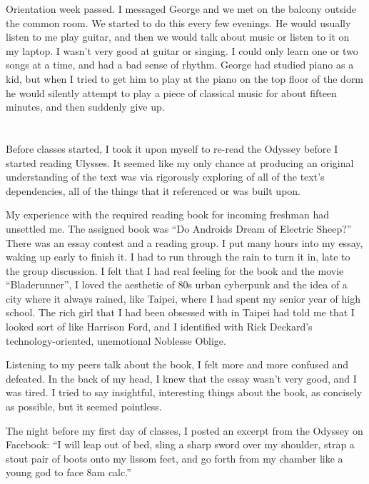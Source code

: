 Orientation week passed.  I messaged George and we met on the balcony outside
the common room.  We started to do this every few evenings.  He would usually
listen to me play guitar, and then we would talk about music or listen to it on
my laptop.  I wasn't very good at guitar or singing.  I could only learn one or
two songs at a time, and had a bad sense of rhythm.  George had studied piano as
a kid, but when I tried to get him to play at the piano on the top floor of the
dorm he would silently attempt to play a piece of classical music for about
fifteen minutes, and then suddenly give up.  

\section{}

Before classes started, I took it upon myself to re-read the Odyssey before I
started reading Ulysses.  It seemed like my only chance at producing an original
understanding of the text was via rigorously exploring of all of the text's
dependencies, all of the things that it referenced or was built upon. 

My experience with the required reading book for incoming freshman had unsettled
me.  The assigned book was ``Do Androids Dream of Electric Sheep?''  There was
an essay contest and a reading group.  I put many hours into my essay, waking up
early to finish it.  I  had to run through the rain to turn it in, late to the
group discussion.  I felt that I had real feeling for the book and the movie
``Bladerunner'', I loved the aesthetic of 80s urban cyberpunk and the idea of a
city where it always rained, like Taipei, where I had spent my senior year of
high school.  The rich girl that I had been obsessed with in Taipei had told me
that I looked sort of like Harrison Ford, and I identified with Rick Deckard's
technology-oriented, unemotional Noblesse Oblige. 

Listening to my peers talk about the book, I felt more and more confused and
defeated.  In the back of my head, I knew that the essay wasn't very good, and I
was tired.  I tried to say insightful, interesting things about the book, as
concisely as possible, but it seemed pointless.

The night before my first day of classes, I posted an excerpt from the Odyssey
on Facebook: ``I will leap out of bed, sling a sharp sword over my shoulder,
strap a stout pair of boots onto my lissom feet, and go forth from my chamber
like a young god to face 8am calc.''


